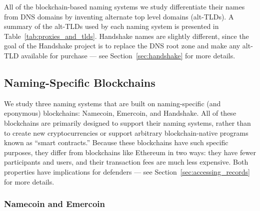 All of the blockchain-based naming systems we study differentiate their names 
from DNS domains by inventing alternate top level domains (alt-TLDs). A 
summary of the alt-TLDs used by each naming system is presented in 
Table~\ref{tab:proxies_and_tlds}. Handshake names are slightly different, since 
the goal of the Handshake project is to replace the DNS root zone and make any 
alt-TLD available for purchase --- see Section~\ref{sec:handshake} for more 
details.


\subsection{Naming-Specific Blockchains}

We study three naming systems that are built on 
naming-specific (and eponymous) blockchains: 
Namecoin, Emercoin, and Handshake. All of these blockchains 
are primarily designed to support their naming systems,  
rather than to create new cryptocurrencies or support arbitrary 
blockchain-native programs known as ``smart contracts.'' Because these 
blockchains have such specific purposes, they differ 
from blockchains like Ethereum in two ways: they have fewer 
participants and users, and their transaction fees are much 
less expensive. Both properties have implications for 
defenders --- see Section~\ref{sec:accessing_records} 
for more details. 

\subsubsection{Namecoin and Emercoin}

